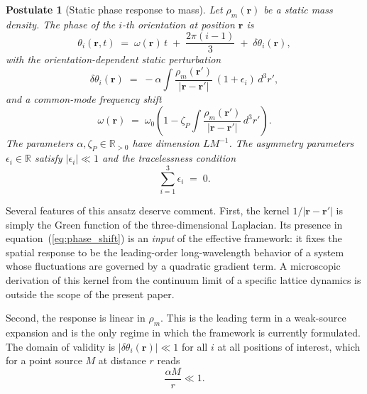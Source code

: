 \documentclass[a4paper,fleqn]{cas-dc}
\theoremstyle{thmstyleone}%
\theoremstyle{thmstyletwo}%
\newtheorem{postulate}{Postulate}%
\begin{document}
\begin{postulate}[Static phase response to mass]
\label{post:response}
Let $\rho_m(\mathbf{r})$ be a static mass density. The
phase of the $i$-th orientation at position $\mathbf{r}$ is
\begin{equation}
    \theta_i(\mathbf{r},t)
    \;=\;
    \omega(\mathbf{r})\,t
    \;+\;
    \frac{2\pi(i-1)}{3}
    \;+\;
    \delta\theta_i(\mathbf{r}),
    \label{eq:total_phase}
\end{equation}
with the orientation-dependent static perturbation
\begin{equation}
    \delta\theta_i(\mathbf{r})
    \;=\;
    -\alpha\int
    \frac{\rho_m(\mathbf{r}')}{|\mathbf{r}-\mathbf{r}'|}
    \,(1+\epsilon_i)\,d^3r',
    \label{eq:phase_shift}
\end{equation}
and a common-mode frequency shift
\begin{equation}
    \omega(\mathbf{r})
    \;=\;
    \omega_0
    \!\left(
      1-\zeta_P
      \int\frac{\rho_m(\mathbf{r}')}{|\mathbf{r}-\mathbf{r}'|}
      \,d^3r'
    \right).
    \label{eq:freq_shift}
\end{equation}
The parameters $\alpha,\zeta_P\in\mathbb{R}_{>0}$ have
dimension $LM^{-1}$. The asymmetry parameters
$\epsilon_i\in\mathbb{R}$ satisfy $|\epsilon_i|\ll 1$ and the
tracelessness condition
\begin{equation}
    \sum_{i=1}^{3}\epsilon_i \;=\; 0.
    \label{eq:trace_constraint}
\end{equation}
\end{postulate}

Several features of this ansatz deserve comment. First, the
kernel $1/|\mathbf{r}-\mathbf{r}'|$ is simply the Green function of the
three-dimensional Laplacian. Its presence in
equation~(\ref{eq:phase_shift}) is an \emph{input} of the
effective framework: it fixes the spatial response to be the
leading-order long-wavelength behavior of a system whose
fluctuations are governed by a quadratic gradient term. A
microscopic derivation of this kernel from the continuum limit
of a specific lattice dynamics is outside the scope of the
present paper.

Second, the response is linear in $\rho_m$. This is the
leading term in a weak-source expansion and is the only regime
in which the framework is currently formulated. The
domain of validity is $|\delta\theta_i(\mathbf{r})|\ll 1$ for
all $i$ at all positions of interest, which for a point source
$M$ at distance $r$ reads
\begin{equation}
\frac{\alpha M}{r}\ll 1.
\label{eq:domain}
\end{equation}
\end{document}
